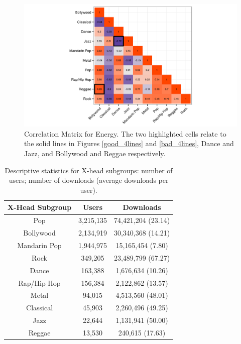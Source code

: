 \documentclass[a4paper]{article}
\begin{document}
\begin{figure}[h!]
\centering
\includegraphics[width=\linewidth]{Energy_corrMat}
\caption[Energy Correlation Matrix]{Correlation Matrix for Energy. The two highlighted cells relate to the solid lines in Figures \ref{good_4lines} and \ref{bad_4lines}, Dance and Jazz, and Bollywood and Reggae respectively.}
\label{energy_corrMat}
\end{figure}

\begin{table}[ht!]
\centering
\begin{tabular}{|c|c|c|}
\hline
\textbf{X-Head Subgroup} & \textbf{Users} & \textbf{Downloads}  \\
\hline
Pop & 3,215,135 & 74,421,204 (23.14)\\
Bollywood & 2,134,919 & 30,340,368 (14.21) \\
Mandarin Pop & 1,944,975 & 15,165,454 (7.80) \\
Rock & 349,205 & 23,489,799 (67.27)  \\
Dance & 163,388 & 1,676,634 (10.26)  \\
Rap/Hip Hop & 156,384 & 2,122,862 (13.57)\\
Metal & 94,015 & 4,513,560 (48.01)  \\
Classical & 45,903 & 2,260,496 (49.25) \\
Jazz & 22,644 & 1,131,941 (50.00) \\
Reggae & 13,530 & 240,615 (17.63) \\
\hline
\end{tabular}
\caption[X-Head Genre Distributions]{Descriptive statistics for X-head subgroups: number of users; number of downloads (average downloads per user). \label{tab:xheadTotals}}
\end{table}
\end{document}
